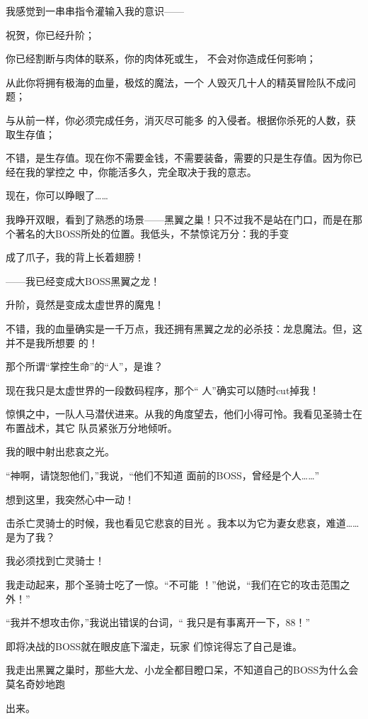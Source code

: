 \documentclass{article}
\begin{document}
\newpage

我感觉到一串串指令灌输入我的意识—— 


祝贺，你已经升阶； 

你已经割断与肉体的联系，你的肉体死或生，
不会对你造成任何影响； 

从此你将拥有极海的血量，极炫的魔法，一个
人毁灭几十人的精英冒险队不成问题； 

与从前一样，你必须完成任务，消灭尽可能多
的入侵者。根据你杀死的人数，获取生存值； 

不错，是生存值。现在你不需要金钱，不需要装备，需要的只是生存值。因为你已经在我的掌控之
中，你能活多久，完全取决于我的意志。 


现在，你可以睁眼了…… 

我睁开双眼，看到了熟悉的场景——黑翼之巢！只不过我不是站在门口，而是在那个著名的大BOSS所处的位置。我低头，不禁惊诧万分：我的手变
\newpage

成了爪子，我的背上长着翅膀！ 


——我已经变成大BOSS黑翼之龙！ 


升阶，竟然是变成太虚世界的魔鬼！ 

不错，我的血量确实是一千万点，我还拥有黑翼之龙的必杀技：龙息魔法。但，这并不是我所想要
的！ 


那个所谓“掌控生命”的“人”，是谁？ 

现在我只是太虚世界的一段数码程序，那个“
人”确实可以随时cut掉我！ 

惊惧之中，一队人马潜伏进来。从我的角度望去，他们小得可怜。我看见圣骑士在布置战术，其它
队员紧张万分地倾听。 


我的眼中射出悲哀之光。 

\newpage

“神啊，请饶恕他们，”我说，“他们不知道
面前的BOSS，曾经是个人……” 


想到这里，我突然心中一动！ 

击杀亡灵骑士的时候，我也看见它悲哀的目光
。我本以为它为妻女悲哀，难道……是为了我？ 


我必须找到亡灵骑士！ 

我走动起来，那个圣骑士吃了一惊。“不可能
！”他说，“我们在它的攻击范围之外！” 

“我并不想攻击你，”我说出错误的台词，“
我只是有事离开一下，88！” 

即将决战的BOSS就在眼皮底下溜走，玩家
们惊诧得忘了自己是谁。 

我走出黑翼之巢时，那些大龙、小龙全都目瞪口呆，不知道自己的BOSS为什么会莫名奇妙地跑
\newpage

出来。 
\end{document}
